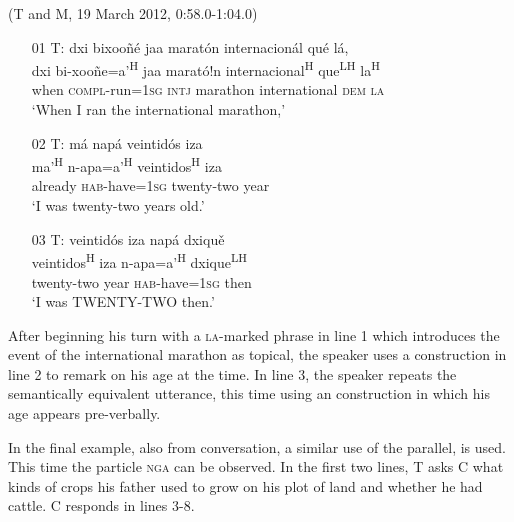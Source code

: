 \ea (T and M, 19 March 2012, 0:58.0-1:04.0)
\begin{itemize}

\item[01 T:] 
\glll dxi bixoo\~{n}\'{e} jaa marat\'{o}n internacion\'{a}l qu\'{e} l\'{a}, \\
dxi bi-xoo\~{n}e=a'\textsuperscript{H} jaa marat\'{o}!n internacional\textsuperscript{H} que\textsuperscript{LH} la\textsuperscript{H} \\
when \textsc{compl}-run=\textsc{1sg} \textsc{intj} marathon international \textsc{dem} \textsc{la} \\
\glt `When I ran the international marathon,'


\item[02 T:] 
\glll m\'{a} nap\'{a} veintid\'{o}s iza \\
 ma'\textsuperscript{H} n-apa=a'\textsuperscript{H} veintidos\textsuperscript{H} iza \\
already \textsc{hab}-have=\textsc{1sg} twenty-two year \\
\glt `I was twenty-two years old.' 


\item[03 T:] 
\glll veintid\'{o}s iza nap\'{a} dxiqu\v{e} \\
veintidos\textsuperscript{H} iza n-apa=a'\textsuperscript{H} dxique\textsuperscript{LH} \\
twenty-two year \textsc{hab}-have=\textsc{1sg} then \\
\glt `I was TWENTY-TWO then.' 


\end{itemize}
\z

After beginning his turn with a \textsc{la}-marked  phrase in line 1 which introduces the event of the international marathon as topical, the speaker uses a  construction in line 2 to remark on his age at the time. In line 3, the speaker repeats the semantically equivalent utterance, this time using an  construction in which his age appears pre-verbally. 


In the final example, also from conversation, a similar use of the parallel,  is used. This time the particle \textsc{nga} can be observed. In the first two lines, T asks C what kinds of crops his father used to grow on his plot of land and whether he had cattle. C responds in lines 3-8.

